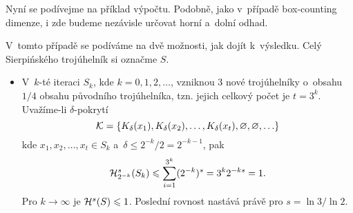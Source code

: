 Nyní se podívejme na příklad výpočtu. Podobně, jako v~případě box-counting dimenze, i zde budeme nezávisle určovat horní a~dolní odhad.
\begin{example}\label{ex:sierpinskeho-trojuhelnik-hd-dimenze}
    V~tomto případě se podíváme na dvě možnosti, jak dojít k~výsledku. Celý Sierpińského trojúhelník si označme $S$.
    \begin{itemize}
        \item V~$k$-té iteraci $S_k$, kde $k=0,1,2,\ldots$, vzniknou 3 nové trojúhelníky o~obsahu $1/4$ obsahu původního trojúhelníka, tzn. jejich celkový počet je $t=3^k$. Uvažíme-li $\delta$-pokrytí
        \[\mathcal{K}=\set{K_\delta(x_1),K_\delta(x_2),\ldots,K_\delta(x_t),\emptyset,\emptyset,\ldots}\]
        kde $x_1,x_2,\ldots,x_t\in S_k$ a~$\delta\leqslant 2^{-k}/2=2^{-k-1}$, pak
        \[\hausdorffdeltameasure{s}{2^{-k}}(S_k)\leqslant\sum_{i=1}^{3^k}(2^{-k})^s=3^k2^{-ks}=1.\]
        Pro $k\to\infty$ je $\hausdorffmeasure{s}(S)\leqslant 1$. Poslední rovnost nastává právě pro $s=\ln{3}/\ln{2}$.


\end{itemize}
\end{example}
